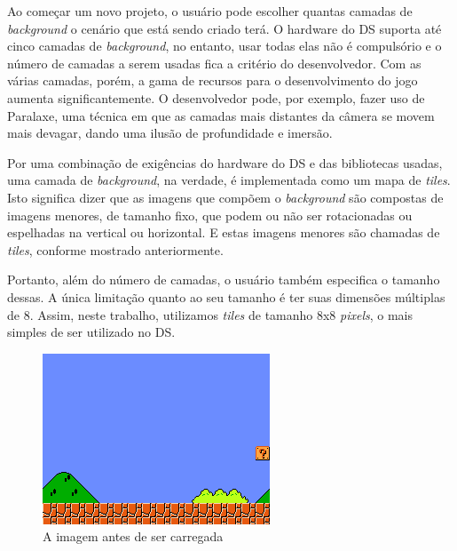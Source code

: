 \documentclass[brazil]{abnt}
\begin{document}
Ao começar um novo projeto, o usuário pode escolher quantas camadas de \textit{background} o cenário que está sendo criado terá. O hardware do DS suporta até cinco camadas de \textit{background}, no entanto, usar todas elas não é compulsório e o número de camadas a serem usadas fica a critério do desenvolvedor. Com as várias camadas, porém, a gama de recursos para o desenvolvimento do jogo aumenta significantemente. O desenvolvedor pode, por exemplo, fazer uso de Paralaxe, uma técnica em que as camadas mais distantes da câmera se movem mais devagar, dando uma ilusão de profundidade e imersão.

Por uma combinação de exigências do hardware do DS e das bibliotecas usadas, uma camada de \textit{background}, na verdade, é implementada como um mapa de \textit{tiles}. Isto significa dizer que as imagens que compõem o \textit{background} são compostas de imagens menores, de tamanho fixo, que podem ou não ser rotacionadas ou espelhadas na vertical ou horizontal. E estas imagens menores são chamadas de \textit{tiles}, conforme mostrado anteriormente.

Portanto, além do número de camadas, o usuário também especifica o tamanho dessas. A única limitação quanto ao seu tamanho é ter suas dimensões múltiplas de 8. Assim, neste trabalho, utilizamos \textit{tiles} de tamanho 8x8 \textit{pixels}, o mais simples de ser utilizado no DS.

\begin{figure}[h!]
\centering
\includegraphics[scale=1]{imgs/exemplo.png}
\caption{A imagem antes de ser carregada} 
\end{figure}
\end{document}
